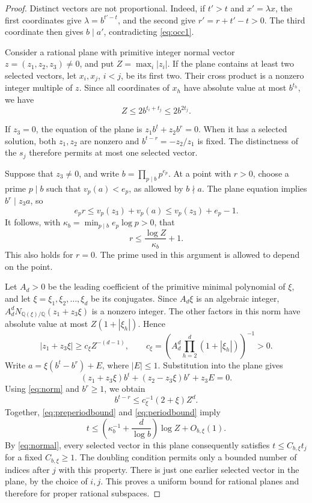 \documentclass[11pt]{article}
\numberwithin{equation}{section}
\theoremstyle{remark}
\newcommand{\Q}{\mathbb Q}
\begin{document}
\begin{proof}
Distinct vectors are not proportional. Indeed, if $t'>t$ and
$x'=\lambda x$, the first coordinates give $\lambda=b^{t'-t}$,
and the second give $r'=r+t'-t>0$. The third coordinate then gives
$b\mid a'$, contradicting \eqref{eq:occ1}.

Consider a rational plane with primitive integer normal vector
$z=(z_1,z_2,z_3)\ne0$, and put $Z=\max_i|z_i|$.
If the plane contains at least two selected vectors, let $x_i,x_j$,
$i<j$, be its first two. Their cross product is a nonzero integer
multiple of $z$. Since all coordinates of $x_h$ have absolute value
at most $b^{t_h}$, we have
\begin{equation}\label{eq:normal}
 Z\le2b^{t_i+t_j}\le2b^{2t_j}.
\end{equation}

If $z_3=0$, the equation of the plane is
$z_1b^t+z_2b^r=0$. When it has a selected solution, both $z_1,z_2$
are nonzero and $b^{t-r}=-z_2/z_1$ is fixed. The distinctness of the
$s_j$ therefore permits at most one selected vector.

Suppose that $z_3\ne0$, and write
$b=\prod_{p\mid b}p^{e_p}$. At a point with $r>0$, choose a prime
$p\mid b$ such that $v_p(a)<e_p$, as allowed by $b\nmid a$.
The plane equation implies $b^r\mid z_3a$, so
\[
 e_pr\le v_p(z_3)+v_p(a)\le v_p(z_3)+e_p-1.
\]
It follows, with $\kappa_b=\min_{p\mid b}e_p\log p>0$, that
\begin{equation}\label{eq:preperiodbound}
 r\le\frac{\log Z}{\kappa_b}+1.
\end{equation}
This also holds for $r=0$. The prime used in this argument is allowed
to depend on the point.

Let $A_d>0$ be the leading coefficient of the primitive minimal
polynomial of $\xi$, and let $\xi=\xi_1,\xi_2,\ldots,\xi_d$ be its
conjugates. Since $A_d\xi$ is an algebraic integer,
$A_d^dN_{\Q(\xi)/\Q}(z_1+z_3\xi)$ is a nonzero integer.
The other factors in this norm have absolute value at most
$Z(1+|\xi_h|)$. Hence
\begin{equation}\label{eq:norm}
 |z_1+z_3\xi|\ge c_\xi Z^{-(d-1)},\qquad
 c_\xi=\left(A_d^d\prod_{h=2}^d(1+|\xi_h|)\right)^{-1}>0.
\end{equation}
Write $a=\xi(b^t-b^r)+E$, where $|E|\le1$.
Substitution into the plane gives
\[
 (z_1+z_3\xi)b^t+(z_2-z_3\xi)b^r+z_3E=0.
\]
Using \eqref{eq:norm} and $b^r\ge1$, we obtain
\begin{equation}\label{eq:periodbound}
 b^{t-r}\le c_\xi^{-1}(2+\xi)Z^d.
\end{equation}
Together, \eqref{eq:preperiodbound} and \eqref{eq:periodbound} imply
\[
 t\le\left(\kappa_b^{-1}+\frac d{\log b}\right)\log Z
       +O_{b,\xi}(1).
\]
By \eqref{eq:normal}, every selected vector in this plane consequently
satisfies $t\le C_{b,\xi}t_j$ for a fixed $C_{b,\xi}\ge1$.
The doubling condition permits only a bounded number of indices after
$j$ with this property. There is just one earlier selected vector in
the plane, by the choice of $i,j$. This proves a uniform bound for
rational planes and therefore for proper rational subspaces.


\end{proof}
\end{document}
